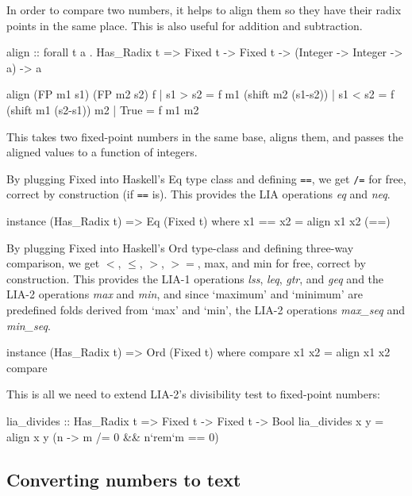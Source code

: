 \documentclass{article}
\begin{document}
In order to compare two numbers, it helps to align them so they
have their radix points in the same place.  This is also useful
for addition and subtraction.

\begin{code}
align :: forall t a . Has_Radix t =>
    Fixed t -> Fixed t -> (Integer -> Integer -> a) -> a

align (FP m1 s1) (FP m2 s2) f
  | s1 > s2 = f m1 (shift m2 (s1-s2))
  | s1 < s2 = f (shift m1 (s2-s1)) m2
  | True    = f m1 m2
\end{code}

This takes two fixed-point numbers in the same base, aligns them,
and passes the aligned values to a function of integers.

By plugging Fixed into Haskell's Eq type class and
defining \verb|==|, we get \verb|/=| for free, correct by
construction (if \verb|==| is).  This provides
the LIA operations {\it eq} and {\it neq}.

\begin{code}
instance (Has_Radix t) => Eq (Fixed t)
  where x1 == x2 = align x1 x2 (==)
\end{code}

By plugging Fixed into Haskell's Ord type-class and
defining three-way comparison, we get $<$, $\le$, $>$, $>=$,
max, and min for free, correct by construction.
This provides the LIA-1 operations {\it lss},
{\it leq}, {\it gtr}, and {\it geq} and the LIA-2 operations
{\it max} and {\it min}, and since `maximum' and `minimum' are
predefined folds derived from `max' and `min', the LIA-2
operations {\it max\_seq} and {\it min\_seq}.

\begin{code}
instance (Has_Radix t) => Ord (Fixed t)
  where compare x1 x2 = align x1 x2 compare
\end{code}

This is all we need to extend LIA-2's divisibility test to
fixed-point numbers:
\begin{code}
lia_divides :: Has_Radix t => Fixed t -> Fixed t -> Bool
lia_divides x y = align x y (\m n -> m /= 0 && n`rem`m == 0)
\end{code}


\subsection{Converting numbers to text}
\end{document}
